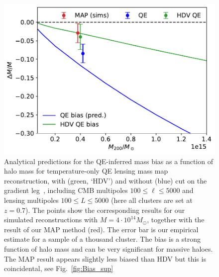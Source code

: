 \documentclass[prd, superscriptaddress, tightenlines, longbibliography, nofootinbib, eqsecnum, amsfonts, amsmath, floatfix, twocolumn, notitlepage]{revtex4-2}
\begin{document}
\begin{figure}
	    \includegraphics[width=0.95\hsize]{Figures/biaspred}
	    \caption{Analytical predictions for the QE-inferred mass bias as a function of halo mass for temperature-only QE lensing mass map reconstruction, with (green, `HDV') and without (blue) cut on the gradient leg~\cite{Hu:2007bt}, including CMB multipoles $100 \leq \ell \leq 5000$ and lensing multipoles $100 \leq L \leq 5000$ (here all clusters are set at $z=0.7$). The points show the corresponding results for our simulated reconstructions with $M=4\cdot 10^{14} M_\odot$, together with the result of our MAP method (red). The error bar is our empirical estimate for a sample of a thousand cluster. The bias is a strong function of halo mass and can be very significant for massive haloes. The MAP result appears slightly less biased than HDV but this is coincidental, see Fig.~\ref{fig:Bias_sup}\label{fig:biaspred}}
\end{figure}
\end{document}
